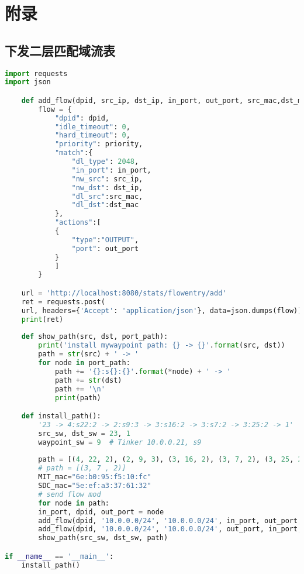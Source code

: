 \documentclass{xjtureport}
\begin{document}
\section{附录}
\subsection{下发二层匹配域流表}
\begin{lstlisting}[language=python]
import requests
import json

	def add_flow(dpid, src_ip, dst_ip, in_port, out_port, src_mac,dst_mac,priority=10):
		flow = {
			"dpid": dpid,
			"idle_timeout": 0,
			"hard_timeout": 0,
			"priority": priority,
			"match":{
				"dl_type": 2048,
				"in_port": in_port,
				"nw_src": src_ip,
				"nw_dst": dst_ip,
				"dl_src":src_mac,
				"dl_dst":dst_mac
			},
			"actions":[
			{
				"type":"OUTPUT",
				"port": out_port
			}
			]
		}

	url = 'http://localhost:8080/stats/flowentry/add'
	ret = requests.post(
	url, headers={'Accept': 'application/json'}, data=json.dumps(flow))
	print(ret)
	
	def show_path(src, dst, port_path):
		print('install mywaypoint path: {} -> {}'.format(src, dst))
		path = str(src) + ' -> '
		for node in port_path:
			path += '{}:s{}:{}'.format(*node) + ' -> '
			path += str(dst)
			path += '\n'
			print(path)

	def install_path():
		'23 -> 4:s22:2 -> 2:s9:3 -> 3:s16:2 -> 3:s7:2 -> 3:25:2 -> 1'
		src_sw, dst_sw = 23, 1
		waypoint_sw = 9  # Tinker 10.0.0.21, s9
		
		path = [(4, 22, 2), (2, 9, 3), (3, 16, 2), (3, 7, 2), (3, 25, 2)]
		# path = [(3, 7 , 2)]
		MIT_mac="6e:b0:95:f5:10:fc"
		SDC_mac="5e:ef:a3:37:61:32"
		# send flow mod
		for node in path:
		in_port, dpid, out_port = node
		add_flow(dpid, '10.0.0.0/24', '10.0.0.0/24', in_port, out_port,SDC_mac,MIT_mac)
		add_flow(dpid, '10.0.0.0/24', '10.0.0.0/24', out_port, in_port,MIT_mac,SDC_mac)
		show_path(src_sw, dst_sw, path)

if __name__ == '__main__':
	install_path()
\end{lstlisting}
\end{document}
